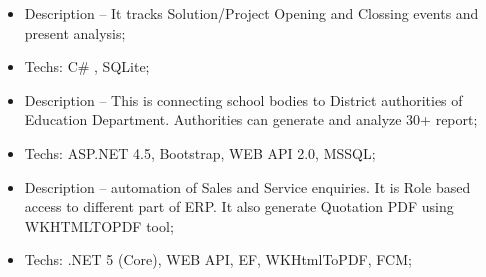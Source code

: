 \documentclass[10pt,a4paper]{altacv}
\begin{document}
\divider
%


%



\begin{itemize}
  \item Description -- It tracks Solution/Project Opening and Clossing events and present analysis;
  \item Techs: C\# , SQLite;
\end{itemize}

\divider

%


\begin{itemize}
  \item Description -- This is connecting school bodies to District authorities of Education Department. Authorities  can generate and analyze 30+ report;
  \item Techs: ASP.NET 4.5, Bootstrap, WEB API 2.0, MSSQL;
\end{itemize}

\divider

%

\begin{itemize}
  \item Description -- automation of Sales and Service enquiries. It is Role based access to different part of ERP. It also generate Quotation PDF using WKHTMLTOPDF tool;
  \item Techs: .NET 5 (Core), WEB API, EF, WKHtmlToPDF, FCM;
\end{itemize}
\end{document}
